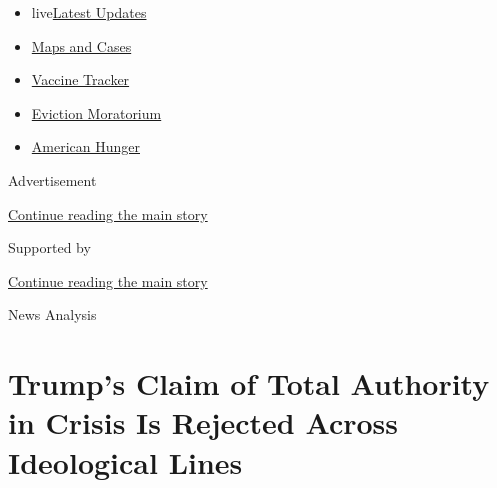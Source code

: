 \begin{itemize}
\tightlist
\item
  live\href{https://www.nytimes3xbfgragh.onion/2020/09/09/world/covid-19-coronavirus.html?name=styln-coronavirus-national\&region=TOP_BANNER\&block=storyline_menu_recirc\&action=click\&pgtype=Article\&impression_id=c97b0400-f296-11ea-95f6-af5fc3a8088f\&variant=undefined}{Latest
  Updates}
\item
  \href{https://www.nytimes3xbfgragh.onion/interactive/2020/us/coronavirus-us-cases.html?name=styln-coronavirus-national\&region=TOP_BANNER\&block=storyline_menu_recirc\&action=click\&pgtype=Article\&impression_id=c97b0401-f296-11ea-95f6-af5fc3a8088f\&variant=undefined}{Maps
  and Cases}
\item
  \href{https://www.nytimes3xbfgragh.onion/interactive/2020/science/coronavirus-vaccine-tracker.html?name=styln-coronavirus-national\&region=TOP_BANNER\&block=storyline_menu_recirc\&action=click\&pgtype=Article\&impression_id=c97b0402-f296-11ea-95f6-af5fc3a8088f\&variant=undefined}{Vaccine
  Tracker}
\item
  \href{https://www.nytimes3xbfgragh.onion/2020/09/02/your-money/eviction-moratorium-covid.html?name=styln-coronavirus-national\&region=TOP_BANNER\&block=storyline_menu_recirc\&action=click\&pgtype=Article\&impression_id=c97b0403-f296-11ea-95f6-af5fc3a8088f\&variant=undefined}{Eviction
  Moratorium}
\item
  \href{https://www.nytimes3xbfgragh.onion/interactive/2020/09/02/magazine/food-insecurity-hunger-us.html?name=styln-coronavirus-national\&region=TOP_BANNER\&block=storyline_menu_recirc\&action=click\&pgtype=Article\&impression_id=c97b0404-f296-11ea-95f6-af5fc3a8088f\&variant=undefined}{American
  Hunger}
\end{itemize}

Advertisement

\protect\hyperlink{after-top}{Continue reading the main story}

Supported by

\protect\hyperlink{after-sponsor}{Continue reading the main story}

News Analysis

\hypertarget{trumps-claim-of-total-authority-in-crisis-is-rejected-across-ideological-lines}{%
\section{Trump's Claim of Total Authority in Crisis Is Rejected Across
Ideological
Lines}\label{trumps-claim-of-total-authority-in-crisis-is-rejected-across-ideological-lines}}

